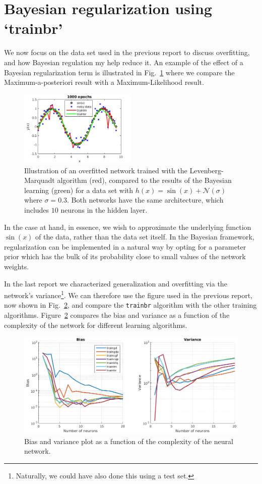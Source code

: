\documentclass[10pt,a4paper]{article}
\begin{document}
\section{Bayesian regularization using `trainbr'}
We now focus on the data set used in the previous report to discuss overfitting, and how Bayesian regulation my help reduce it.  An example of the effect of a Bayesian regularization term is illustrated in Fig.~\ref{fig:overfitting_example} where we compare the Maximum-a-posteriori result with a Maximum-Likelihood result.
\begin{figure}[htb]
\centering
\includegraphics[width=0.5\textwidth]{figs/overfitting_example.png}
\caption{Illustration of an overfitted network trained with the Levenberg-Marquadt algorithm (red), compared to the results of the Bayesian learning (green) for a data set with $h(x)=\sin(x) + \mathcal{N}(\sigma)$ where $\sigma = 0.3$. Both networks have the same architecture, which includes $10$ neurons in the hidden layer.\label{fig:overfitting_example}}
\end{figure}
In the case at hand, in essence, we wish to approximate the underlying function $\sin(x)$ of the data, rather than the data set itself. In the Bayesian framework, regularization can be implemented in a natural way by opting for a parameter prior which has the bulk of its probability close to small values of the network weights. 

In the last report we characterized generalization and overfitting via the network's variance\footnote{Naturally, we could have also done this using a test set.}. We can therefore use the figure used in the previous report, now shown in Fig.~\ref{fig:bias_and_variance_plot}, and compare the \texttt{trainbr} algorithm with the other training algorithms. Figure~\ref{fig:bias_and_variance_plot} compares the bias and variance as a function of the complexity of the network for different learning algorithms.
 
\begin{figure}[hbt]
\centering
\includegraphics[width=\textwidth]{figs/bias_and_variance.png}
\caption{Bias and variance plot as a function of the complexity of the neural network.\label{fig:bias_and_variance_plot}}
\end{figure}
\end{document}
